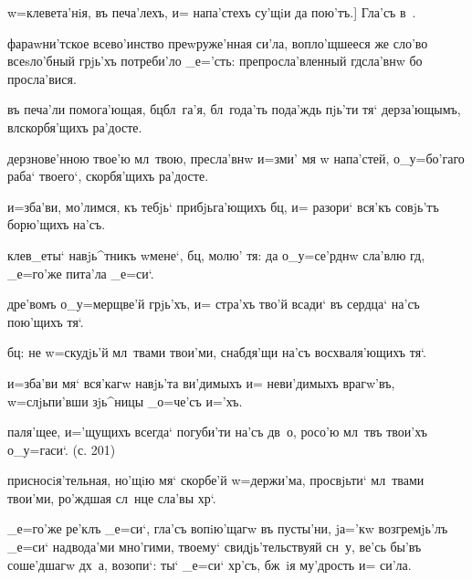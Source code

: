 
w=клевета'нiя, въ печа'лехъ, и= напа'стехъ су'щiи да 
пою'тъ.] Гла'съ в~.%


фараwни'тское всево'инство преwруже'нная си'ла, 
вопло'щшееся же сло'во всеsло'бный грjь'хъ потреби'ло 
_е='сть: препросла'вленный гд сла'внw бо просла'вися.

въ печа'ли помога'ющая, бц бл~га'я, бл~года'ть 
пода'ждь пjь'ти тя` дерза'ющымъ, вл скорбя'щихъ 
ра'досте.

дерзнове'нною твое'ю мл~твою, пресла'внw и=зми' мя w\т 
напа'стей, о_у=бо'гаго раба` твоего`, скорбя'щихъ 
ра'досте.

и=зба'ви, мо'лимся, къ тебjь` прибjьга'ющихъ бц, и= 
разори` вся'къ совjь'тъ борю'щихъ на'съ.

клев_еты` навjь^тникъ w\т мене`, бц, молю' тя: да 
о_у=се'рднw сла'влю гд, _е=го'же пита'ла _е=си`.


дре'вомъ о_у=мерщве'й грjь'хъ, и= стра'хъ тво'й всади` въ 
сердца` на'съ пою'щихъ тя`.

бц: не w=скудjь'й мл~твами твои'ми, снабдя'щи на'съ 
восхваля'ющихъ тя`.

и=зба'ви мя` вся'кагw навjь'та ви'димыхъ и= неви'димыхъ 
врагw'въ, w=слjьпи'вши зjь^ницы _о=че'съ и='хъ.

паля'щее, и='щущихъ всегда` погуби'ти на'съ дв~о, росо'ю 
мл~твъ твои'хъ о_у=гаси`. (с. 201)

присносiя'тельная, но'щiю мя` скорбе'й w=держи'ма, 
просвjьти` мл~твами твои'ми, ро'ждшая сл~нце сла'вы 
хр`.


_е=го'же ре'клъ _е=си`, гла'съ вопiю'щагw въ пусты'ни, 
jа='кw возгремjь'лъ _е=си` над\ъ вода'ми мно'гими, 
твоему` свидjь'тельствуяй сн~у, ве'сь бы'въ соше'дшагw 
дх~а, возопи`: ты` _е=си` хр'съ, бж~iя му'дрость и= 
си'ла.

